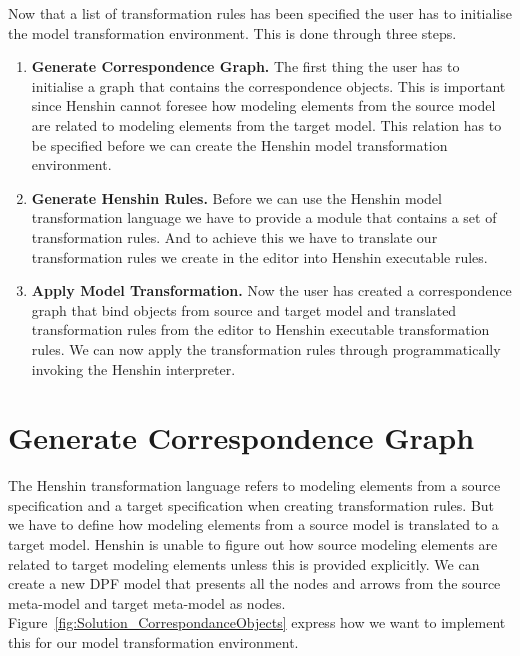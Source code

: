 Now that a list of transformation rules has been specified the user has to
initialise the model transformation environment. This is done through three
steps. 

\begin{enumerate}

\item \textbf{Generate Correspondence Graph.} The first thing the user has to
initialise a graph that contains the correspondence objects. This is important since
Henshin cannot foresee how modeling elements from the source model are related
to modeling elements from the target model. This relation has to be specified
before we can create the Henshin model transformation environment. 

\item \textbf{Generate Henshin Rules.} Before we can use the Henshin model
transformation language we have to provide a module that contains a set of transformation
rules. And to achieve this we have to translate our transformation rules we
create in the editor into Henshin executable rules. 

\item \textbf{Apply Model Transformation.} Now the user has created a
correspondence graph that bind objects from source and target model and
translated transformation rules from the editor to Henshin executable
transformation rules. We can now apply the transformation rules through
programmatically invoking the Henshin interpreter.

\end{enumerate}


\section{Generate Correspondence Graph}

The Henshin transformation language refers to modeling elements from a source
specification and a target specification when creating transformation rules. But
we have to define how modeling elements from a source model is translated to a
target model. Henshin is unable to figure out how source modeling elements are
related to target modeling elements unless this is provided explicitly. We can
create a new DPF model that presents all the nodes and arrows from the source
meta-model and target meta-model as nodes.
Figure~\ref{fig:Solution_CorrespondanceObjects} express how we want to implement
this for our model transformation environment.

